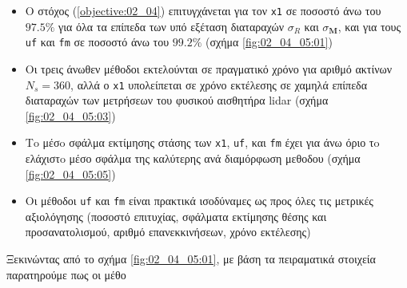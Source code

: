 \begin{framed}
\begin{itemize}
  \item Ο στόχος (\ref{objective:02_04}) επιτυγχάνεται για τον \texttt{x1} σε
        ποσοστό άνω του $97.5\%$ για όλα τα επίπεδα των υπό εξέταση διαταραχών
        $\sigma_R$ και $\sigma_{\bm{M}}$, και για τους \texttt{uf} και
        \texttt{fm} σε ποσοστό άνω του $99.2\%$ (σχήμα \ref{fig:02_04_05:01})
  \item Οι τρεις άνωθεν μέθοδοι εκτελούνται σε πραγματικό χρόνο για αριθμό
        ακτίνων $N_s = 360$, αλλά ο \texttt{x1} υπολείπεται σε χρόνο εκτέλεσης
        σε χαμηλά επίπεδα διαταραχών των μετρήσεων του φυσικού αισθητήρα lidar
        (σχήμα \ref{fig:02_04_05:03})
  \item Τo μέσo σφάλμα εκτίμησης στάσης των \texttt{x1}, \texttt{uf}, και
        \texttt{fm} έχει για άνω όριο τo ελάχιστo μέσο σφάλμα της καλύτερης
        ανά διαμόρφωση μεθοδου (σχήμα \ref{fig:02_04_05:05})
  \item Οι μέθοδοι \texttt{uf} και \texttt{fm} είναι πρακτικά ισοδύναμες ως προς
        όλες τις μετρικές αξιολόγησης (ποσοστό επιτυχίας, σφάλματα εκτίμησης
        θέσης και προσανατολισμού, αριθμό επανεκκινήσεων, χρόνο εκτέλεσης)
\end{itemize}
\end{framed}

Ξεκινώντας από το σχήμα \ref{fig:02_04_05:01}, με βάση τα πειραματικά στοιχεία
παρατηρούμε πως οι μέθο
